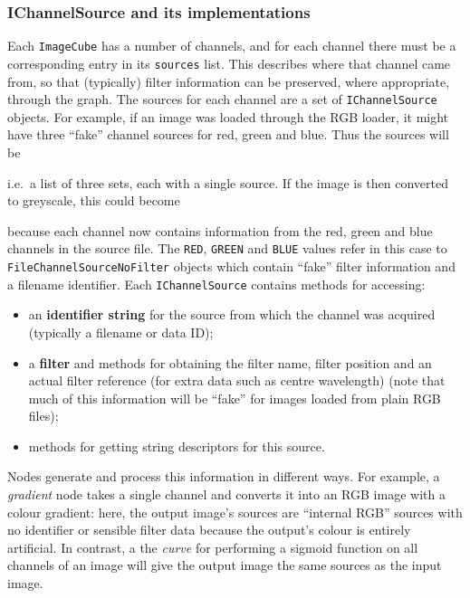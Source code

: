 \subsubsection{IChannelSource and its implementations}
Each \texttt{ImageCube} has a number of channels, and for each channel there must be a corresponding
entry in its \texttt{sources} list. This describes where that channel came from, so that (typically) filter
information can be preserved, where appropriate, through the graph. The sources for each channel are a set
of \texttt{IChannelSource} objects. For example, if an image was loaded through the RGB loader, it might
have three ``fake'' channel sources for red, green and blue. Thus the sources will be 
\begin{v}
\end{v}
i.e.\ a list of three sets, each with a single source.
If the image is then converted to greyscale, this could
become
\begin{v}
\end{v}
because each channel now contains information from the red, green and blue channels in the source file.
The \texttt{RED}, \texttt{GREEN} and \texttt{BLUE} values refer in this case to \texttt{FileChannelSourceNoFilter} objects
which contain ``fake'' filter information and a filename identifier.
Each \texttt{IChannelSource} contains methods for accessing:
\begin{itemize}
\item an \textbf{identifier string} for the source from which the channel was acquired (typically a filename or data ID);
\item a \textbf{filter} and methods for obtaining the filter name, filter position and an actual filter reference (for extra data such as centre wavelength) (note
that much of this information will be ``fake'' for images loaded from plain RGB files);
\item methods for getting string descriptors for this source.
\end{itemize}

Nodes generate and process this information in different ways. For example, a \emph{gradient} node takes a single channel and converts it into an RGB image with
a colour gradient: here, the output image's sources are ``internal RGB'' sources with no identifier or sensible filter data because the output's colour
is entirely artificial. In contrast, a the \emph{curve} for performing a sigmoid function on all channels of an image will give the output image the
same sources as the input image.

